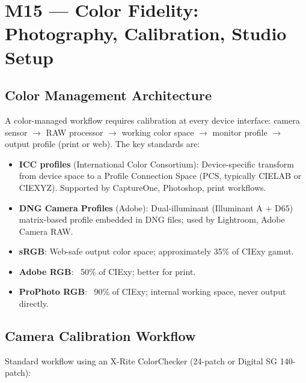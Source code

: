 \documentclass[11pt,letterpaper]{article}
\begin{document}
\newpage

\section{M15 — Color Fidelity: Photography, Calibration, Studio Setup}

\subsection{Color Management Architecture}

A color-managed workflow requires calibration at every device interface: camera sensor $\to$ RAW processor $\to$ working color space $\to$ monitor profile $\to$ output profile (print or web). The key standards are:

\begin{itemize}[noitemsep]
  \item \textbf{ICC profiles} (International Color Consortium): Device-specific transform from device space to a Profile Connection Space (PCS, typically CIELAB or CIEXYZ). Supported by CaptureOne, Photoshop, print workflows.
  \item \textbf{DNG Camera Profiles} (Adobe): Dual-illuminant (Illuminant A + D65) matrix-based profile embedded in DNG files; used by Lightroom, Adobe Camera RAW.
  \item \textbf{sRGB}: Web-safe output color space; approximately 35\% of CIExy gamut.
  \item \textbf{Adobe RGB}: ~50\% of CIExy; better for print.
  \item \textbf{ProPhoto RGB}: ~90\% of CIExy; internal working space, never output directly.
\end{itemize}

\subsection{Camera Calibration Workflow}

Standard workflow using an X-Rite ColorChecker (24-patch or Digital SG 140-patch):
\end{document}
